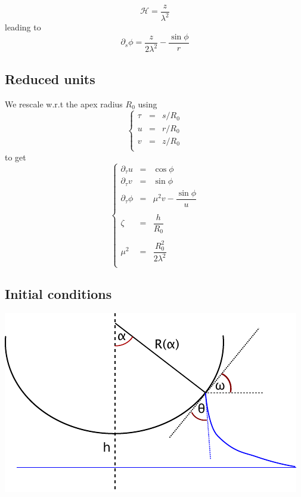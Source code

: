 \documentclass[aps,onecolumn]{revtex4}
\begin{document}
\begin{equation}
	\mathcal{H} = \dfrac{z}{\lambda^2}
\end{equation}
leading to
\begin{equation}
	\partial_s \phi = \dfrac{z}{2\lambda^2} - \dfrac{\sin\phi}{r}
\end{equation}

\subsection{Reduced units}
We rescale w.r.t the apex radius $R_0$ using
\begin{equation}
	\left\lbrace
	\begin{array}{rcl}
		\tau & = & s/R_0 \\
		 u   & = & r/R_0 \\
		 v   & = & z/R_0 \\
	\end{array}
	\right.
\end{equation}
to get
\begin{equation}
	\left\lbrace
	\begin{array}{rcl}
	\partial_\tau u & = & \cos\phi\\
	\partial_\tau v & = & \sin\phi\\
	\partial_\tau \phi & = &  \mu^2 v - \dfrac{\sin\phi}{u}\\
	\\
	\zeta              & = & \dfrac{h}{R_0}\\
	\\
	\mu^2                & = & \dfrac{R_0^2}{2\lambda^2}\\
	\end{array}
	\right.
\end{equation}
	
\subsection{Initial conditions}

\begin{center}
\includegraphics{geometry.pdf}
\end{center}
\end{document}

